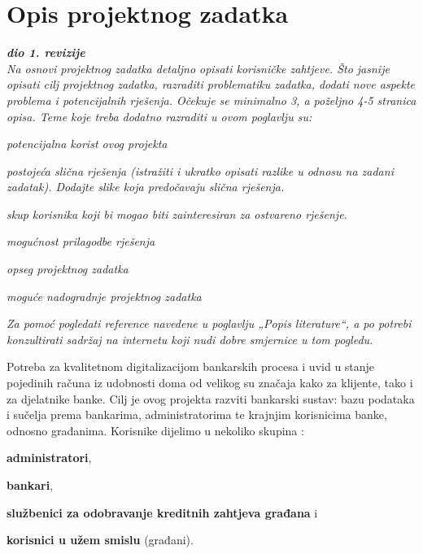 \chapter{Opis projektnog zadatka}
		
		\textbf{\textit{dio 1. revizije}}\\
		
		\textit{Na osnovi projektnog zadatka detaljno opisati korisničke zahtjeve. Što jasnije opisati cilj projektnog zadatka, razraditi problematiku zadatka, dodati nove aspekte problema i potencijalnih rješenja. Očekuje se minimalno 3, a poželjno 4-5 stranica opisa.	Teme koje treba dodatno razraditi u ovom poglavlju su:}
		\begin{packed_item}
			\item \textit{potencijalna korist ovog projekta}
			\item \textit{postojeća slična rješenja (istražiti i ukratko opisati razlike u odnosu na zadani zadatak). Dodajte slike koja predočavaju slična rješenja.}
			\item \textit{skup korisnika koji bi mogao biti zainteresiran za ostvareno rješenje.}
			\item \textit{mogućnost prilagodbe rješenja }
			\item \textit{opseg projektnog zadatka}
			\item \textit{moguće nadogradnje projektnog zadatka}
		\end{packed_item}
		
		\textit{Za pomoć pogledati reference navedene u poglavlju „Popis literature“, a po potrebi konzultirati sadržaj na internetu koji nudi dobre smjernice u tom pogledu.}
		\eject
		
		Potreba za kvalitetnom digitalizacijom bankarskih procesa i uvid u stanje pojedinih računa iz udobnosti doma od velikog su značaja kako za klijente, tako i za djelatnike banke. Cilj je ovog projekta razviti bankarski sustav: bazu podataka i sučelja prema bankarima, administratorima te krajnjim korisnicima banke, odnosno građanima.
		Korisnike dijelimo u nekoliko skupina : 
		\begin{packed_item}
			\item \textbf{administratori}, 
			\item \textbf{bankari},
			\item \textbf{službenici za odobravanje kreditnih zahtjeva građana} i 
			\item \textbf{korisnici u užem smislu} (građani).
		\end{packed_item}
		
